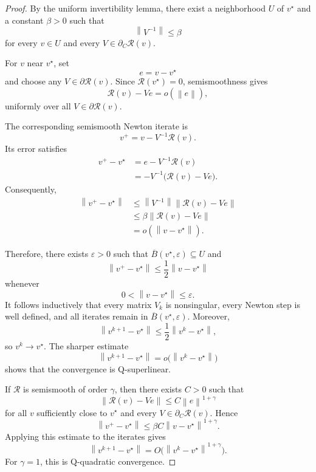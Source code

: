 \documentclass[a4paper,11pt]{book}
\theoremstyle{plain}
\theoremstyle{definition}
\theoremstyle{remark}
\numberwithin{equation}{chapter}
\numberwithin{algorithm}{chapter}
\newcommand{\norm}[1]{\left\|#1\right\|}
\begin{document}
	\begin{proof}
		By the uniform invertibility lemma, there exist a neighborhood \(U\) of
		\(v^\star\) and a constant \(\beta>0\) such that
		\[
		\norm{V^{-1}}\leq\beta
		\]
		for every \(v\in U\) and every
		\(V\in\partial_C\mathcal R(v)\).
		
		For \(v\) near \(v^\star\), set
		\[
		e=v-v^\star
		\]
		and choose any \(V\in\partial\mathcal R(v)\). Since
		\(\mathcal R(v^\star)=0\), semismoothness gives
		\[
		\mathcal R(v)-Ve=o(\norm{e}),
		\]
		uniformly over all \(V\in\partial\mathcal R(v)\).
		
		The corresponding semismooth Newton iterate is
		\[
		v^+=v-V^{-1}\mathcal R(v).
		\]
		Its error satisfies
		\begin{align}
			v^+-v^\star
			&=
			e-V^{-1}\mathcal R(v)\\
			&=
			-V^{-1}\bigl(\mathcal R(v)-Ve\bigr).
		\end{align}
		Consequently,
		\begin{align}
			\norm{v^+-v^\star}
			&\leq
			\norm{V^{-1}}
			\norm{\mathcal R(v)-Ve}\\
			&\leq
			\beta
			\norm{\mathcal R(v)-Ve}\\
			&=
			o(\norm{v-v^\star}).
		\end{align}
		
		Therefore, there exists \(\varepsilon>0\) such that
		\(\overline B(v^\star,\varepsilon)\subseteq U\) and
		\[
		\norm{v^+-v^\star}
		\leq
		\frac12\norm{v-v^\star}
		\]
		whenever
		\[
		0<\norm{v-v^\star}\leq\varepsilon.
		\]
		It follows inductively that every matrix \(V_k\) is nonsingular, every
		Newton step is well defined, and all iterates remain in
		\(\overline B(v^\star,\varepsilon)\). Moreover,
		\[
		\norm{v^{k+1}-v^\star}
		\leq
		\frac12\norm{v^k-v^\star},
		\]
		so \(v^k\to v^\star\). The sharper estimate
		\[
		\norm{v^{k+1}-v^\star}
		=
		o\bigl(\norm{v^k-v^\star}\bigr)
		\]
		shows that the convergence is Q-superlinear.
		
		If \(\mathcal R\) is semismooth of order \(\gamma\), then there exists
		\(C>0\) such that
		\[
		\norm{\mathcal R(v)-Ve}
		\leq
		C\norm{e}^{1+\gamma}
		\]
		for all \(v\) sufficiently close to \(v^\star\) and every
		\(V\in\partial_C\mathcal R(v)\). Hence
		\[
		\norm{v^+-v^\star}
		\leq
		\beta C\norm{v-v^\star}^{1+\gamma}.
		\]
		Applying this estimate to the iterates gives
		\[
		\norm{v^{k+1}-v^\star}
		=
		O\bigl(\norm{v^k-v^\star}^{1+\gamma}\bigr).
		\]
		For \(\gamma=1\), this is Q-quadratic convergence.
	\end{proof}
	
\end{document}
